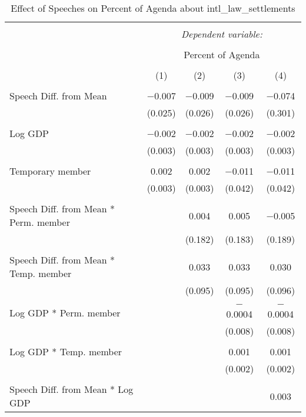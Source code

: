 
\begin{table}[!htbp] \centering 
  \caption{Effect of Speeches on Percent of Agenda about intl_law_settlements} 
  \label{} 
\begin{tabular}{@{\extracolsep{5pt}}lcccc} 
\\[-1.8ex]\hline 
\hline \\[-1.8ex] 
 & \multicolumn{4}{c}{\textit{Dependent variable:}} \\ 
\cline{2-5} 
\\[-1.8ex] & \multicolumn{4}{c}{Percent of Agenda} \\ 
\\[-1.8ex] & (1) & (2) & (3) & (4)\\ 
\hline \\[-1.8ex] 
 Speech Diff. from Mean & $-$0.007 & $-$0.009 & $-$0.009 & $-$0.074 \\ 
  & (0.025) & (0.026) & (0.026) & (0.301) \\ 
  & & & & \\ 
 Log GDP & $-$0.002 & $-$0.002 & $-$0.002 & $-$0.002 \\ 
  & (0.003) & (0.003) & (0.003) & (0.003) \\ 
  & & & & \\ 
 Temporary member & 0.002 & 0.002 & $-$0.011 & $-$0.011 \\ 
  & (0.003) & (0.003) & (0.042) & (0.042) \\ 
  & & & & \\ 
 Speech Diff. from Mean * Perm. member &  & 0.004 & 0.005 & $-$0.005 \\ 
  &  & (0.182) & (0.183) & (0.189) \\ 
  & & & & \\ 
 Speech Diff. from Mean * Temp. member &  & 0.033 & 0.033 & 0.030 \\ 
  &  & (0.095) & (0.095) & (0.096) \\ 
  & & & & \\ 
 Log GDP * Perm. member &  &  & $-$0.0004 & $-$0.0004 \\ 
  &  &  & (0.008) & (0.008) \\ 
  & & & & \\ 
 Log GDP * Temp. member &  &  & 0.001 & 0.001 \\ 
  &  &  & (0.002) & (0.002) \\ 
  & & & & \\ 
 Speech Diff. from Mean * Log GDP &  &  &  & 0.003 \\ 

\end{tabular}
\end{table}
